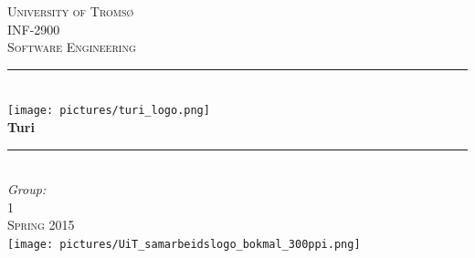 \documentclass[a4paper]{article}
\begin{document}
\begin{titlepage}

\newcommand{\HRule}{\rule{\linewidth}{0.7mm}} %


\center %
 

\textsc{\LARGE University of Tromsø}\\[1.5cm] %
\textsc{\Large INF-2900}\\[0.5cm] %
\textsc{\large Software Engineering}\\[0.5cm] %


\HRule \\[0.5cm]
\texttt{[image: pictures/turi\_logo.png]}\\[0.5cm]
{ \huge \bfseries Turi}\\[0.5cm] %
\HRule \\[1cm]
 


\Large \emph{Group:}\\
1\\[1.5cm] %

\textsc{\large Spring 2015}\\[3cm] %


\texttt{[image: pictures/UiT\_samarbeidslogo\_bokmal\_300ppi.png]}\\[1cm] 
 

\vfill %

\end{titlepage}
\end{document}
